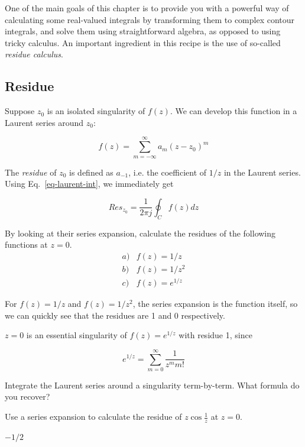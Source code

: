 
One of the main goals of this chapter is to provide you with a powerful way of calculating some real-valued integrals by transforming them to complex contour integrals, and solve them using straightforward algebra, as opposed to using tricky calculus. An important ingredient in this recipe is the use of so-called \emph{residue calculus}.

\subsection*{Residue}

Suppose $z_0$ is an isolated singularity of $f(z)$. We can develop this function in a Laurent series around $z_0$:

\begin{equation}
f(z)= \sum_{m=-\infty}^{\infty} a_m (z-z_0)^m
\end{equation} 

The \emph{residue} of $z_0$ is defined as $a_{-1}$, i.e. the coefficient of $1/z$ in the Laurent series. Using Eq.~\ref{eq-laurent-int}, we immediately get

\begin{equation}
Res_{z_0}=\frac{1}{2 \pi j }  \oint_{{C}} f(z) dz \label{eq-res-int}
\end{equation}

\begin{cue}
  By looking at their series expansion, calculate the residues of the following functions at $z=0$.
  $$\begin{array}{lcll}a) & f(z)=1/z \\b) & f(z)=1/z^2 \\c) & f(z)=e^{1/z}\end{array}$$
\end{cue}

For $f(z)=1/z$ and $f(z)=1/z^2$, the series expansion is the function itself, so we can quickly see that the residues are 1 and 0 respectively.

$z=0$ is an essential singularity of $f(z)=e^{1/z}$ with residue 1, since

$$e^{1/z} = \sum_{m=0}^{\infty} \frac{1}{z^m m!} $$

\begin{exer}
  Integrate the Laurent series around a singularity term-by-term. What formula do you recover?
\end{exer}

\begin{exer}
  Use a series expansion to calculate the residue of $z \cos \frac{1}{z}$ at $z=0$.
  \begin{sol}
    $-1/2$
  \end{sol}
\end{exer}

